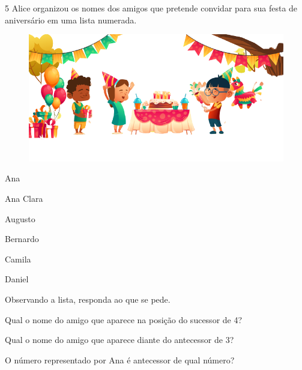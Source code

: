 \pagebreak

\num{5} Alice organizou os nomes dos amigos que pretende convidar para sua
festa de aniversário em uma lista numerada.

\begin{figure}[htpb!]
\includegraphics[width=\textwidth]{./media/image28a.png}
\end{figure}

\begin{myquote}
\begin{enumerate}
\begin{multicols}{2}
\item Ana

\item Ana Clara

\item Augusto

\item Bernardo

\item Camila

\item Daniel
\end{multicols}
\end{enumerate}
\end{myquote}

Observando a lista, responda ao que se pede.

\begin{escolha}
\item Qual o nome do amigo que aparece na posição do sucessor de 4?

\item Qual o nome do amigo que aparece diante do antecessor de 3?

\item O número representado por Ana é antecessor de qual número?
\end{escolha}

